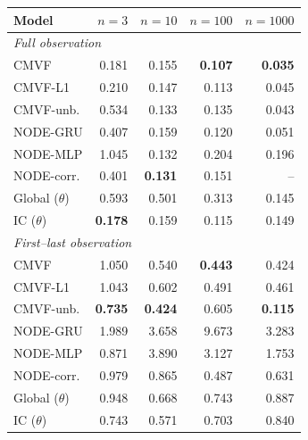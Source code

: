 \begin{tabular}{lrrrr}
\toprule
Model & $n{=}3$ & $n{=}10$ & $n{=}100$ & $n{=}1000$ \\
\midrule
\multicolumn{5}{l}{\emph{Full observation}} \\
CMVF & 0.181 & 0.155 & \textbf{0.107} & \textbf{0.035} \\
CMVF-L1 & 0.210 & 0.147 & 0.113 & 0.045 \\
CMVF-unb. & 0.534 & 0.133 & 0.135 & 0.043 \\
NODE-GRU & 0.407 & 0.159 & 0.120 & 0.051 \\
NODE-MLP & 1.045 & 0.132 & 0.204 & 0.196 \\
NODE-corr. & 0.401 & \textbf{0.131} & 0.151 & -- \\
Global ($\theta$) & 0.593 & 0.501 & 0.313 & 0.145 \\
IC ($\theta$) & \textbf{0.178} & 0.159 & 0.115 & 0.149 \\
\midrule
\multicolumn{5}{l}{\emph{First--last observation}} \\
CMVF & 1.050 & 0.540 & \textbf{0.443} & 0.424 \\
CMVF-L1 & 1.043 & 0.602 & 0.491 & 0.461 \\
CMVF-unb. & \textbf{0.735} & \textbf{0.424} & 0.605 & \textbf{0.115} \\
NODE-GRU & 1.989 & 3.658 & 9.673 & 3.283 \\
NODE-MLP & 0.871 & 3.890 & 3.127 & 1.753 \\
NODE-corr. & 0.979 & 0.865 & 0.487 & 0.631 \\
Global ($\theta$) & 0.948 & 0.668 & 0.743 & 0.887 \\
IC ($\theta$) & 0.743 & 0.571 & 0.703 & 0.840 \\
\bottomrule
\end{tabular}
